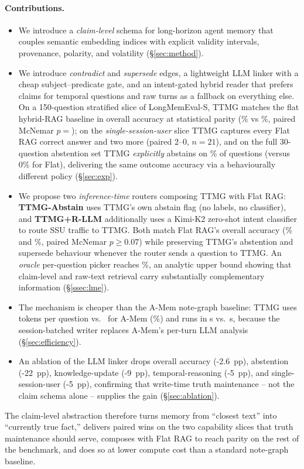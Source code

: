 \paragraph{Contributions.}
\begin{itemize}
  \item We introduce a \emph{claim-level} schema for long-horizon agent
  memory that couples semantic embedding indices with explicit
  validity intervals, provenance, polarity, and volatility
  (\S\ref{sec:method}).
  \item We introduce \emph{contradict} and \emph{supersede} edges, a
  lightweight LLM linker with a cheap subject--predicate gate, and an
  intent-gated hybrid reader that prefers claims for temporal
  questions and raw turns as a fallback on everything else. On a
  150-question stratified slice of LongMemEval-S, TTMG matches the
  flat hybrid-RAG baseline in overall accuracy at statistical parity
  (\TTMGLMEAcc\% vs \FlatLMEAcc\%, paired McNemar
  $p{=}$\McnemarOverall); on the \emph{single-session-user} slice
  TTMG captures every Flat RAG correct answer and two more (paired
  2--0, $n{=}21$), and on the full 30-question abstention set TTMG
  \emph{explicitly} abstains on \TTMGABSFullAbstainRate\% of
  questions (versus 0\% for Flat), delivering the same outcome
  accuracy via a behaviourally different policy
  (\S\ref{sec:exp}).
  \item We propose two \emph{inference-time} routers composing TTMG
  with Flat RAG: \textbf{TTMG-Abstain} uses TTMG's own abstain flag
  (no labels, no classifier), and \textbf{TTMG+R-LLM} additionally
  uses a Kimi-K2 zero-shot intent classifier to route SSU traffic
  to TTMG. Both match Flat RAG's overall accuracy
  (\AbstainRouterAcc\% and \LLMRouterAcc\%, paired McNemar
  $p \geq 0.07$) while preserving TTMG's abstention and supersede
  behaviour whenever the router sends a question to TTMG. An
  \emph{oracle} per-question picker reaches \OracleLMEAcc\%, an
  analytic upper bound showing that claim-level and raw-text
  retrieval carry substantially complementary information
  (\S\ref{ssec:lme}).
  \item The mechanism is cheaper than the A-Mem note-graph baseline:
  TTMG uses \TTMGTokens{} tokens per question vs.\ \AmemTokens{}
  for A-Mem (\TokensOverhead\%) and runs in \TTMGLatency{}s vs.\
  \AmemLatency{}s, because the session-batched writer replaces
  A-Mem's per-turn LLM analysis (\S\ref{sec:efficiency}).
  \item An ablation of the LLM linker drops overall accuracy
  (-2.6~pp), abstention (-22~pp), knowledge-update (-9~pp),
  temporal-reasoning (-5~pp), and single-session-user (-5~pp),
  confirming that write-time truth maintenance -- not the claim
  schema alone -- supplies the gain (\S\ref{sec:ablation}).
\end{itemize}

The claim-level abstraction therefore turns memory from ``closest
text'' into ``currently true fact,'' delivers paired wins on the two
capability slices that truth maintenance should serve, composes with
Flat RAG to reach parity on the rest of the benchmark, and does so
at lower compute cost than a standard note-graph baseline.
